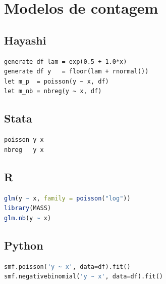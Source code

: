 \section{Modelos de contagem}

\subsection*{Hayashi}

\begin{lstlisting}
generate df lam = exp(0.5 + 1.0*x)
generate df y   = floor(lam + rnormal())
let m_p  = poisson(y ~ x, df)
let m_nb = nbreg(y ~ x, df)
\end{lstlisting}

\subsection*{Stata}

\begin{lstlisting}[language={}, basicstyle=\ttfamily\small,
  frame=single, numbers=none, backgroundcolor=\color{codbg}]
poisson y x
nbreg   y x
\end{lstlisting}

\subsection*{R}

\begin{lstlisting}[language=R, basicstyle=\ttfamily\small,
  frame=single, numbers=none, backgroundcolor=\color{codbg},
  keywordstyle=\color{keyword}\bfseries,
  stringstyle=\color{string},
  commentstyle=\color{comment}\itshape]
glm(y ~ x, family = poisson("log"))
library(MASS)
glm.nb(y ~ x)
\end{lstlisting}

\subsection*{Python}

\begin{lstlisting}[language=Python, basicstyle=\ttfamily\small,
  frame=single, numbers=none, backgroundcolor=\color{codbg},
  keywordstyle=\color{keyword}\bfseries,
  stringstyle=\color{string},
  commentstyle=\color{comment}\itshape]
smf.poisson('y ~ x', data=df).fit()
smf.negativebinomial('y ~ x', data=df).fit()
\end{lstlisting}

